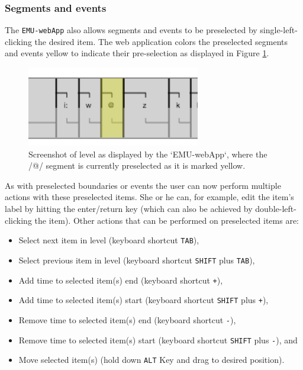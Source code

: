 \documentclass[]{book}
\providecommand{\tightlist}{%
  \setlength{\itemsep}{0pt}\setlength{\parskip}{0pt}}
\theoremstyle{definition}
\theoremstyle{definition}
\theoremstyle{definition}
\theoremstyle{remark}
\begin{document}
\hypertarget{segments-events}{%
\subsubsection{Segments and events}\label{segments-events}}

The \texttt{EMU-webApp} also allows segments and events to be
preselected by single-left-clicking the desired item. The web
application colors the preselected segments and events yellow to
indicate their pre-selection as displayed in Figure
\ref{fig:webApp-preSelSeg}.

\begin{figure}

{\centering \includegraphics[width=0.4\linewidth]{pics/preSelSeg} 

}

\caption{Screenshot of level as displayed by the `EMU-webApp`, where the /@/ segment is currently preselected as it is marked yellow.}\label{fig:webApp-preSelSeg}
\end{figure}

As with preselected boundaries or events the user can now perform
multiple actions with these preselected items. She or he can, for
example, edit the item's label by hitting the enter/return key (which
can also be achieved by double-left-clicking the item). Other actions
that can be performed on preselected items are:

\begin{itemize}
\tightlist
\item
  Select next item in level (keyboard shortcut \texttt{TAB}),
\item
  Select previous item in level (keyboard shortcut \texttt{SHIFT} plus
  \texttt{TAB}),
\item
  Add time to selected item(s) end (keyboard shortcut \texttt{+}),
\item
  Add time to selected item(s) start (keyboard shortcut \texttt{SHIFT}
  plus \texttt{+}),
\item
  Remove time to selected item(s) end (keyboard shortcut \texttt{-}),
\item
  Remove time to selected item(s) start (keyboard shortcut
  \texttt{SHIFT} plus \texttt{-}), and
\item
  Move selected item(s) (hold down \texttt{ALT} Key and drag to desired
  position).
\end{itemize}
\end{document}
